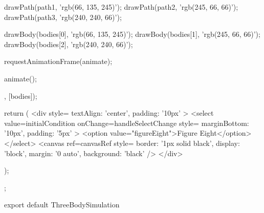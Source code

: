 \documentclass[a4paper,12pt,twoside]{article}
\begin{document}
\begin{javascript}
{{{            drawPath(path1, 'rgb(66, 135, 245)');
            drawPath(path2, 'rgb(245, 66, 66)');
            drawPath(path3, 'rgb(240, 240, 66)');

            drawBody(bodies[0], 'rgb(66, 135, 245)');
            drawBody(bodies[1], 'rgb(245, 66, 66)');
            drawBody(bodies[2], 'rgb(240, 240, 66)');

            requestAnimationFrame(animate);
        }

        animate();

    }, [bodies]);

    return (
        <div style={{ textAlign: 'center', padding: '10px' }}>
            <select value={initialCondition} onChange={handleSelectChange} style={{ marginBottom: '10px', padding: '5px' }}>
                <option value="figureEight">Figure Eight</option>
            </select>
            <canvas ref={canvasRef} style={{ border: '1px solid black', display: 'block', margin: '0 auto', background: 'black' }} />
        </div>

    );
};


export default ThreeBodySimulation
\end{javascript}
\newpage
\end{document}

